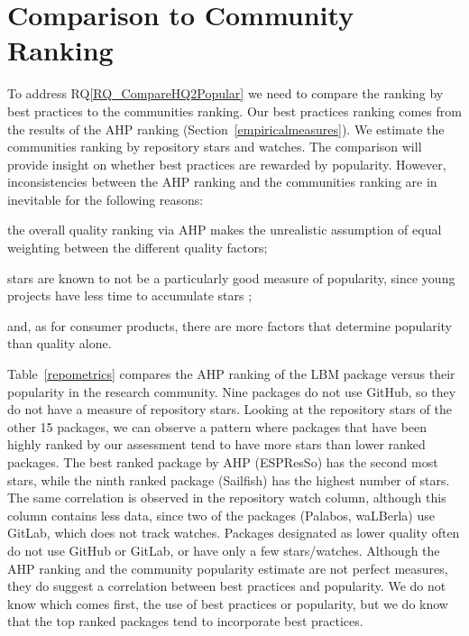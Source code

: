 \documentclass[runningheads]{llncs}
\newcommand{\rqref}[1]{RQ\ref{#1}}
\begin{document}
\section{Comparison to Community Ranking} \label{repmetrics}

To address \rqref{RQ_CompareHQ2Popular} we need to compare the ranking by best
practices to the communities ranking.  Our best practices ranking comes from the
results of the AHP ranking (Section~\ref{empiricalmeasures}).  We estimate the
communities ranking by repository stars and watches.  The comparison will
provide insight on whether best practices are rewarded by popularity.  However,
inconsistencies between the AHP ranking and the communities ranking are in
inevitable for the following reasons: 
\begin{inparaenum}[i)]
	\item the overall quality ranking via AHP makes the unrealistic assumption
	of equal weighting between the different quality factors;
	\item stars are known to not be a particularly good measure of popularity,
	since young projects have less time to accumulate stars \cite{}; 
	\item and, as for consumer products, there are more factors that determine
	popularity than quality alone.
\end{inparaenum}

Table~\ref{repometrics} compares the AHP ranking of the LBM package versus their
popularity in the research community.  Nine packages do not use GitHub, so they
do not have a measure of repository stars. Looking at the repository stars of
the other 15 packages, we can observe a pattern where packages that have been
highly ranked by our assessment tend to have more stars than lower ranked
packages. The best ranked package by AHP (ESPResSo) has the second most stars,
while the ninth ranked package (Sailfish) has the highest number of stars. The
same correlation is observed in the repository watch column, although this
column contains less data, since two of the packages (Palabos, waLBerla) use
GitLab, which does not track watches. Packages designated as lower quality often
do not use GitHub or GitLab, or have only a few stars/watches. Although the AHP
ranking and the community popularity estimate are not perfect measures, they do
suggest a correlation between best practices and popularity. We do not know
which comes first, the use of best practices or popularity, but we do know that
the top ranked packages tend to incorporate best practices.
\end{document}
